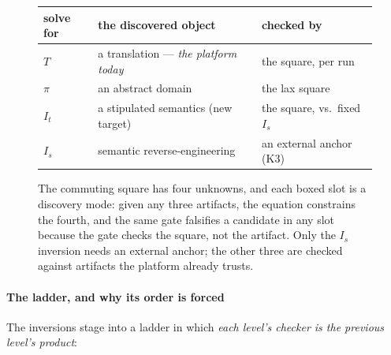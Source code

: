 \begin{figure}
\centering
{}

\medskip
\footnotesize
\setlength{\tabcolsep}{3.5pt}
\begin{tabular}{@{}lll@{}}
\toprule
solve for & the discovered object & checked by \\
\midrule
$T$ & a translation --- \emph{the platform today} & the square, per run \\
$\pi$ & an abstract domain & the lax square \\
$I_t$ & a stipulated semantics (new target) & the square, vs.\ fixed $I_s$ \\
$I_s$ & semantic reverse-engineering & an external anchor (K3) \\
\bottomrule
\end{tabular}
\caption{The commuting square has four unknowns, and each boxed slot
is a discovery mode: given any three artifacts, the equation
constrains the fourth, and the same gate falsifies a candidate in
any slot because the gate checks the square, not the artifact. Only
the $I_s$ inversion needs an external anchor; the other three are
checked against artifacts the platform already trusts.}
\label{fig:inversions}
\end{figure}

\paragraph{The ladder, and why its order is forced}
The inversions stage into a ladder in which \emph{each level's
checker is the previous level's product}:

